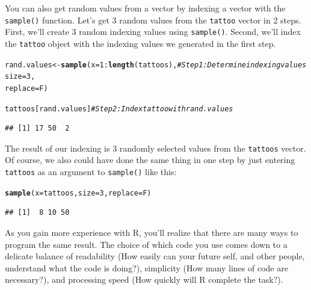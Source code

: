 \documentclass{tufte-book}\usepackage[]{graphicx}\usepackage[]{color}
\makeatletter
\newcommand{\hlnum}[1]{\textcolor[rgb]{0.686,0.059,0.569}{#1}}%
\newcommand{\hlcom}[1]{\textcolor[rgb]{0.678,0.584,0.686}{\textit{#1}}}%
\newcommand{\hlopt}[1]{\textcolor[rgb]{0,0,0}{#1}}%
\newcommand{\hlstd}[1]{\textcolor[rgb]{0.345,0.345,0.345}{#1}}%
\newcommand{\hlkwb}[1]{\textcolor[rgb]{0.69,0.353,0.396}{#1}}%
\newcommand{\hlkwc}[1]{\textcolor[rgb]{0.333,0.667,0.333}{#1}}%
\newcommand{\hlkwd}[1]{\textcolor[rgb]{0.737,0.353,0.396}{\textbf{#1}}}%
\newenvironment{kframe}{%
 \def\at@end@of@kframe{}%
 \ifinner\ifhmode%
  \def\at@end@of@kframe{\end{minipage}}%
  \begin{minipage}{\columnwidth}%
 \fi\fi%
 \def\FrameCommand##1{\hskip\@totalleftmargin \hskip-\fboxsep
 \colorbox{shadecolor}{##1}\hskip-\fboxsep
     \hskip-\linewidth \hskip-\@totalleftmargin \hskip\columnwidth}%
 \MakeFramed {\advance\hsize-\width
   \@totalleftmargin\z@ \linewidth\hsize
   \@setminipage}}%
 {\par\unskip\endMakeFramed%
 \at@end@of@kframe}
\newenvironment{knitrout}{}{} %
\makeatother
\begin{document}
\begin{marginfigure}
You can also get random values from a vector by indexing a vector with the \texttt{sample()} function. Let's get 3 random values from the \texttt{tattoo} vector in 2 steps. First, we'll create 3 random indexing values using \texttt{sample()}. Second, we'll index the \texttt{tattoo} object with the indexing values we generated in the first step.


\begin{knitrout}
\color{fgcolor}\begin{kframe}
\begin{alltt}
\hlstd{rand.values} \hlkwb{<-} \hlkwd{sample}\hlstd{(}\hlkwc{x} \hlstd{=} \hlnum{1}\hlopt{:}\hlkwd{length}\hlstd{(tattoos),}  \hlcom{# Step 1: Determine indexing values}
                      \hlkwc{size} \hlstd{=} \hlnum{3}\hlstd{,}
                      \hlkwc{replace} \hlstd{= F)}

\hlstd{tattoos[rand.values]} \hlcom{# Step 2: Index tattoo with rand.values}
\end{alltt}
\begin{verbatim}
## [1] 17 50  2
\end{verbatim}
\end{kframe}
\end{knitrout}


The result of our indexing is 3 randomly selected values from the \texttt{tattoos} vector. Of course, we also could have done the same thing in one step by just entering \texttt{tattoos} as an argument to \texttt{sample()} like this:


\begin{knitrout}
\color{fgcolor}\begin{kframe}
\begin{alltt}
\hlkwd{sample}\hlstd{(}\hlkwc{x} \hlstd{= tattoos,} \hlkwc{size} \hlstd{=} \hlnum{3}\hlstd{,} \hlkwc{replace} \hlstd{= F)}
\end{alltt}
\begin{verbatim}
## [1]  8 10 50
\end{verbatim}
\end{kframe}
\end{knitrout}

\end{marginfigure}

As you gain more experience with R, you'll realize that there are many ways to program the same result. The choice of which code you use comes down to a delicate balance of readability (How easily can your future self, and other people, understand what the code is doing?), simplicity (How many lines of code are necessary?), and processing speed (How quickly will R complete the task?).
\end{document}
